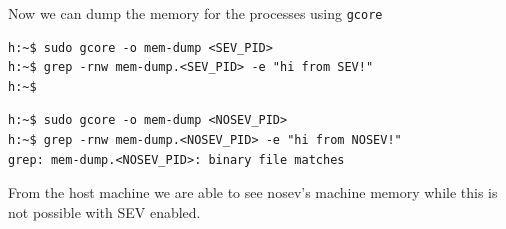 \documentclass[twocolumn]{article}
\begin{document}
Now we can dump the memory for the processes using \texttt{gcore}

    \begin{verbatim}
h:~$ sudo gcore -o mem-dump <SEV_PID>
h:~$ grep -rnw mem-dump.<SEV_PID> -e "hi from SEV!"
h:~$
    \end{verbatim}

    \begin{verbatim}
h:~$ sudo gcore -o mem-dump <NOSEV_PID>
h:~$ grep -rnw mem-dump.<NOSEV_PID> -e "hi from NOSEV!"
grep: mem-dump.<NOSEV_PID>: binary file matches
    \end{verbatim}

    From the host machine we are able to see nosev's machine memory while this is not possible with SEV enabled.
\end{document}

